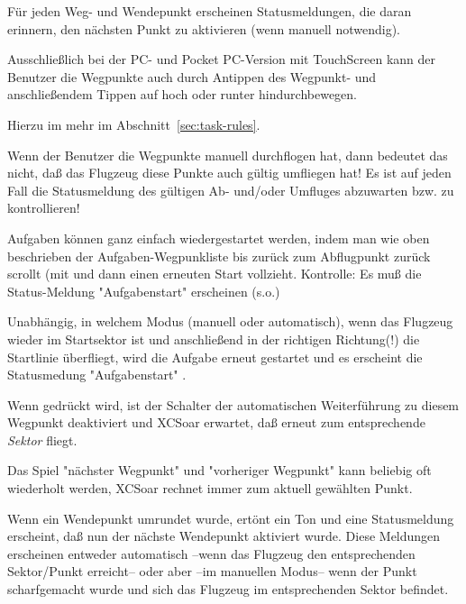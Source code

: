 Für jeden Weg- und Wendepunkt erscheinen Statusmeldungen, die daran erinnern, den nächsten Punkt zu aktivieren (wenn manuell notwendig).

Ausschließlich bei der  PC- und Pocket PC-Version mit TouchScreen kann der Benutzer die Wegpunkte auch durch Antippen des Wegpunkt-{\InfoBox} und anschließendem Tippen auf hoch oder runter hindurchbewegen.

Hierzu im mehr im Abschnitt~\ref{sec:task-rules}.

\warning Wenn der Benutzer die Wegpunkte  manuell durchflogen hat, dann bedeutet das nicht, daß das Flugzeug diese Punkte auch gültig umfliegen hat! Es ist auf jeden Fall die Statusmeldung des gültigen Ab- und/oder Umfluges abzuwarten bzw. zu kontrollieren!


\tip Aufgaben können ganz einfach wiedergestartet  werden, indem man wie oben beschrieben der Aufgaben-Wegpunkliste bis zurück zum Abflugpunkt zurück scrollt (mit  und dann einen erneuten Start vollzieht. Kontrolle: Es muß die Status-Meldung "Aufgabenstart" erscheinen (s.o.)

Unabhängig, in welchem Modus (manuell oder automatisch), wenn das Flugzeug wieder im Startsektor ist und anschließend in der \textcolor[rgb]{0.00,0.00,0.50}{richtigen Richtung(!)} die Startlinie überfliegt, wird die Aufgabe erneut gestartet und es erscheint die Statusmedung  "Aufgabenstart" .


Wenn  gedrückt wird, ist der Schalter der automatischen Weiterführung zu diesem Wegpunkt deaktiviert und \textsf{XCSoar} erwartet, daß erneut zum entsprechende \textsl{Sektor} fliegt.

Das Spiel "nächster Wegpunkt" und "vorheriger Wegpunkt" kann  beliebig oft wiederholt werden, \textsf{XCSoar} rechnet immer zum aktuell gewählten Punkt.

Wenn ein Wendepunkt umrundet  wurde, ertönt ein Ton und eine Statusmeldung erscheint, daß nun  der nächste Wendepunkt aktiviert wurde. Diese Meldungen erscheinen entweder automatisch --wenn das Flugzeug den entsprechenden Sektor/Punkt erreicht--  oder aber --im manuellen Modus-- wenn der Punkt scharfgemacht wurde und sich das Flugzeug im entsprechenden Sektor befindet.


